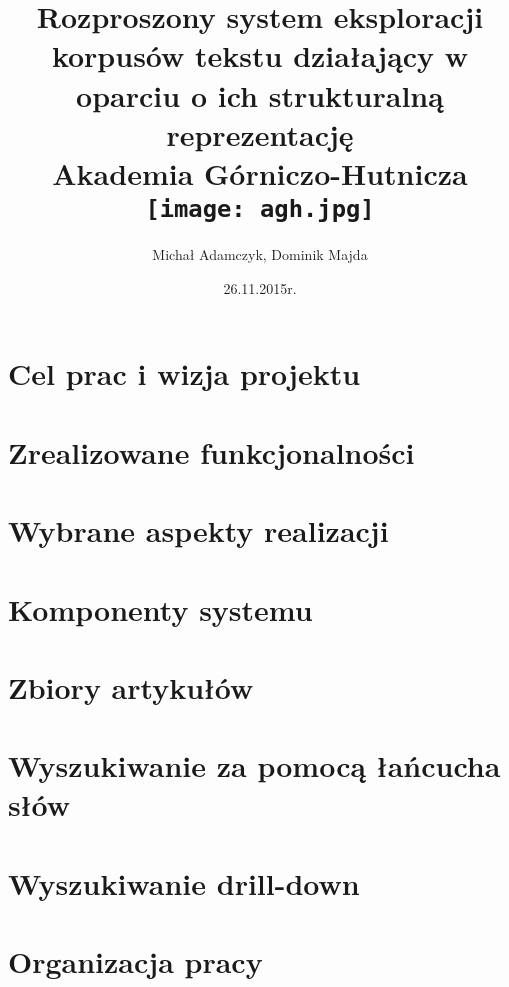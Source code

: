 \documentclass[12pt]{report}
\title{
	{Rozproszony system eksploracji korpusów tekstu działający w oparciu o ich strukturalną reprezentację}\\
	{\large Akademia Górniczo-Hutnicza}\\
	\vspace{1.5cm}
	{\texttt{[image: agh.jpg]}}
}
\author{Michał Adamczyk, Dominik Majda}
\date{26.11.2015r.}
\begin{document}


\tableofcontents

\chapter{Cel prac i wizja projektu}


\chapter{Zrealizowane funkcjonalności}


\chapter{Wybrane aspekty realizacji}



\chapter{Komponenty systemu}


\chapter{Zbiory artykułów}


\chapter{Wyszukiwanie za pomocą łańcucha słów}


\chapter{Wyszukiwanie drill-down}


\chapter{Organizacja pracy}

\end{document}
